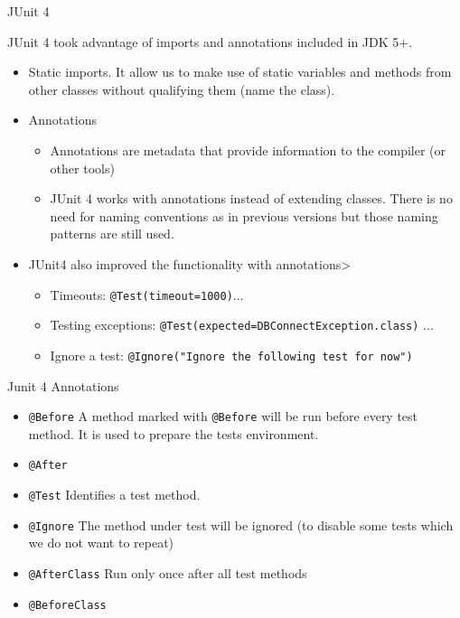 \documentclass[11pt, xcolor=svgnames]{beamer}
\begin{document}
\begin{frame}{JUnit 4}

JUnit 4 took advantage of imports and annotations included in JDK 5+.
\begin{itemize}
  \item Static imports. It allow us to make use of static variables and methods from other classes without qualifying them (name the class).

  \item Annotations 
    \begin{itemize}
    \item Annotations are metadata that provide information to the compiler (or other tools)
    \item JUnit 4 works with annotations instead of extending classes. There is no need for naming conventions as in previous versions but those naming patterns are still used. 
    \end{itemize}

  \item JUnit4 also improved the functionality with annotations>
    \begin{itemize}
    \item Timeouts: \texttt{@Test(timeout=1000)}...
    \item Testing exceptions: \texttt{@Test(expected=DBConnectException.class)} ...
    \item Ignore a test: \texttt{@Ignore("Ignore the following test for now")}
    \end{itemize}
\end{itemize}

\end{frame}



\begin{frame}{Junit 4 Annotations}

\begin{itemize}
  \item \texttt{@Before} A method marked with \texttt{@Before} will be run before every test method. It is used to prepare the tests environment.
  \item \texttt{@After}
  \item \texttt{@Test} Identifies a test method.
  \item \texttt{@Ignore} The method under test will be ignored (to disable some tests which we do not want to repeat)
  \item \texttt{@AfterClass} Run only once after all test methods
  \item \texttt{@BeforeClass}
  \end{itemize}
\end{frame}
\end{document}
